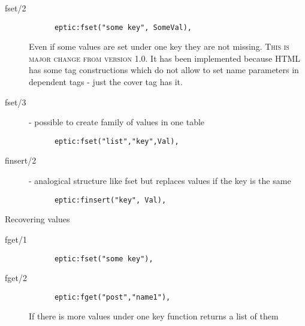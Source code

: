\begin{description}
  \item[fset/2] 
\begin{Verbatim}
      eptic:fset("some key", SomeVal),
\end{Verbatim}
   
    Even if some values are set under one key they are not missing. {\large\textsc{This is
    major change from version 1.0.}} It has been implemented because HTML has some
    tag constructions which do not allow to set name parameters in dependent
    tags - just the cover tag has it.
  \item[fset/3] - possible to create family of values in one table \begin{verbatim}
      eptic:fset("list","key",Val),
    \end{verbatim}
  \item[finsert/2] - analogical structure like fset but replaces values if the
    key is the same \begin{verbatim}
      eptic:finsert("key", Val),
    \end{verbatim}  
\end{description}
Recovering values
\begin{description}
  \item[fget/1] \begin{verbatim}
      eptic:fset("some key"),
    \end{verbatim}
  \item [fget/2]  \begin{verbatim}
      eptic:fget("post","name1"),
    \end{verbatim}
    If there is more values under one key function returns a list of them
\end{description}
\clearpage
